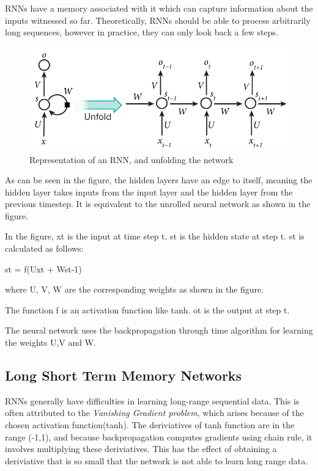 \documentclass[11pt]{article}
\begin{document}
RNNs have a memory associated with it which can capture information about the inputs witnessed so far. Theoretically, RNNs should be able to process arbitrarily long sequences, however in practice, they can only look back a few steps.

\begin{figure}
  \includegraphics[width=\linewidth]{rnn.jpg}
  \caption{Representation of an RNN, and unfolding the network}
  \label{fig:rnn}
\end{figure}

As can be seen in the figure, the hidden layers have an edge to itself, meaning the hidden layer takes inputs from the input layer and the hidden layer from the previous timestep. It is equivalent to the unrolled neural network as shown in the figure.

In the figure, xt is the input at time step t. st is the hidden state at step t. st is calculated as follows:

st = f(Uxt + Wst-1)

where U, V, W are the corresponding weights as shown in the figure.

The function f is an activation function like tanh. ot is the output at step t.

The neural network uses the backpropagation through time algorithm for learning the weights U,V and W.

\subsection{Long Short Term Memory Networks}

RNNs generally have difficulties in learning long-range sequential data. This is often attributed to the \emph{Vanishing Gradient problem}, which arises because of the chosen activation function(tanh). The deriviatives of tanh function are in the range (-1,1), and because backpropagation computes gradients using chain rule, it involves multiplying these deriviatives. This has the effect of obtaining a deriviative that is so small that the network is not able to learn long range data.
\end{document}
